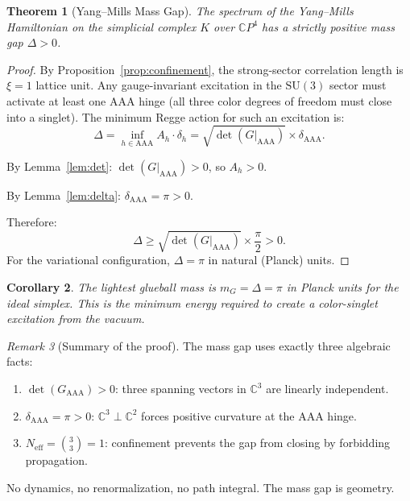 \documentclass[12pt]{article}
\newtheorem{theorem}{Theorem}[section]
\newtheorem{corollary}[theorem]{Corollary}
\theoremstyle{remark}
\newtheorem{remark}[theorem]{Remark}
\begin{document}
\begin{theorem}[Yang--Mills Mass Gap]
\label{thm:massgap}
The spectrum of the Yang--Mills Hamiltonian on the simplicial complex $K$
over $\mathbb{C}P^4$ has a strictly positive mass gap $\Delta > 0$.
\end{theorem}

\begin{proof}
By Proposition~\ref{prop:confinement}, the strong-sector correlation
length is $\xi = 1$ lattice unit. Any gauge-invariant excitation in
the $\mathrm{SU}(3)$ sector must activate at least one AAA hinge
(all three color degrees of freedom must close into a singlet).
The minimum Regge action for such an excitation is:
\begin{equation}
\Delta = \inf_{h \in \mathrm{AAA}} A_h \cdot \delta_h
= \sqrt{\det(G|_{\mathrm{AAA}})} \times \delta_{\mathrm{AAA}}.
\end{equation}

By Lemma~\ref{lem:det}: $\det(G|_{\mathrm{AAA}}) > 0$,
so $A_h > 0$.

By Lemma~\ref{lem:delta}: $\delta_{\mathrm{AAA}} = \pi > 0$.

Therefore:
\begin{equation}
\boxed{\Delta \geq \sqrt{\det(G|_{\mathrm{AAA}})} \times
\frac{\pi}{2} > 0.}
\end{equation}
For the variational configuration, $\Delta = \pi$ in natural
(Planck) units.
\end{proof}

\begin{corollary}
The lightest glueball mass is $m_G = \Delta = \pi$ in Planck units
for the ideal simplex. This is the minimum energy required to create
a color-singlet excitation from the vacuum.
\end{corollary}

\begin{remark}[Summary of the proof]
The mass gap uses exactly three algebraic facts:
\begin{enumerate}
\item[(i)] $\det(G_{\mathrm{AAA}}) > 0$: three spanning vectors in
  $\mathbb{C}^3$ are linearly independent.
\item[(ii)] $\delta_{\mathrm{AAA}} = \pi > 0$:
  $\mathbb{C}^3 \perp \mathbb{C}^2$ forces positive curvature at the
  AAA hinge.
\item[(iii)] $N_{\mathrm{eff}} = \binom{3}{3} = 1$: confinement
  prevents the gap from closing by forbidding propagation.
\end{enumerate}
No dynamics, no renormalization, no path integral. The mass gap is
geometry.
\end{remark}
\end{document}
